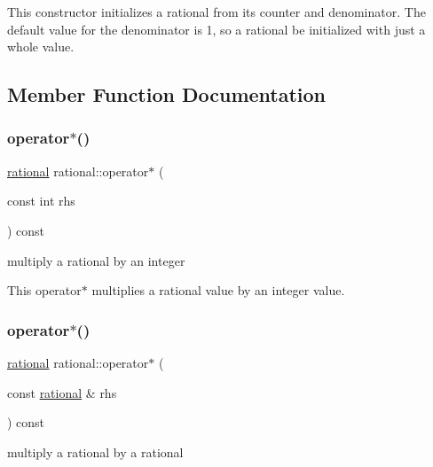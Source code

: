 This constructor initializes a rational from its counter and denominator. The default value for the denominator is 1, so a rational be initialized with just a whole value. 

\subsection{Member Function Documentation}
\mbox{\label{classrational_a9c0f08f8be5db907dc6d93ad3f5cb26b}} 
\subsubsection{\texorpdfstring{operator$\ast$()}{operator*()}\hspace{0.1cm}{\footnotesize\ttfamily [1/2]}}
{\footnotesize\ttfamily \hyperlink{classrational}{rational} rational\+::operator$\ast$ (\begin{DoxyParamCaption}\item[{const int}]{rhs }\end{DoxyParamCaption}) const\hspace{0.3cm}{\ttfamily [inline]}}



multiply a rational by an integer 

This operator$\ast$ multiplies a rational value by an integer value. \mbox{\label{classrational_a1dd39ab2daf08ee68087fdbb37be258e}} 
\subsubsection{\texorpdfstring{operator$\ast$()}{operator*()}\hspace{0.1cm}{\footnotesize\ttfamily [2/2]}}
{\footnotesize\ttfamily \hyperlink{classrational}{rational} rational\+::operator$\ast$ (\begin{DoxyParamCaption}\item[{const \hyperlink{classrational}{rational} \&}]{rhs }\end{DoxyParamCaption}) const\hspace{0.3cm}{\ttfamily [inline]}}



multiply a rational by a rational 

